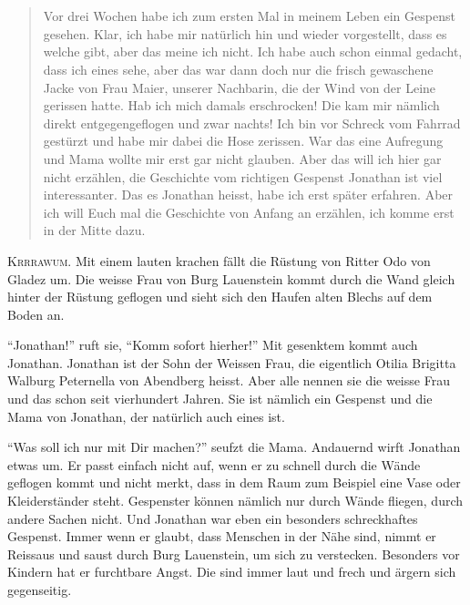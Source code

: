 \chapter*{}

\begin{quote}Vor drei Wochen habe ich zum ersten Mal in meinem Leben ein Gespenst gesehen. Klar, ich habe mir natürlich hin und wieder vorgestellt, dass es welche gibt, aber das meine ich nicht. Ich habe auch schon einmal gedacht, dass ich eines sehe, aber das war dann doch nur die frisch gewaschene Jacke von Frau Maier, unserer Nachbarin, die der Wind von der Leine gerissen hatte. Hab ich mich damals erschrocken! Die kam mir nämlich direkt entgegengeflogen und zwar nachts! Ich bin vor Schreck vom Fahrrad gestürzt und habe mir dabei die Hose zerissen. War das eine Aufregung und Mama wollte mir erst gar nicht glauben. Aber das will ich hier gar nicht erzählen, die Geschichte vom richtigen Gespenst Jonathan ist viel interessanter.  Das es Jonathan heisst, habe ich erst später erfahren. Aber ich will Euch mal die Geschichte von Anfang an erzählen, ich komme erst in der Mitte dazu.
\end{quote}

\lettrine[lines=2]{\color{red}K}{rrrawum.} Mit einem lauten krachen fällt die Rüstung von Ritter Odo von Gladez um. Die weisse Frau von Burg Lauenstein kommt durch die Wand gleich hinter der Rüstung geflogen und sieht sich den Haufen alten Blechs auf dem Boden an.

\enquote{Jonathan!} ruft sie, \enquote{Komm sofort hierher!} Mit gesenktem kommt auch Jonathan. Jonathan ist der Sohn der Weissen Frau, die eigentlich Otilia Brigitta Walburg Peternella von Abendberg heisst. Aber alle nennen sie die weisse Frau und das schon seit vierhundert Jahren. Sie ist nämlich ein Gespenst und die Mama von Jonathan, der natürlich auch eines ist. 

\enquote{Was soll ich nur mit Dir machen?} seufzt die Mama. Andauernd wirft Jonathan etwas um. Er passt einfach nicht auf, wenn er zu schnell durch die Wände geflogen kommt und nicht merkt, dass in dem Raum zum Beispiel eine Vase oder Kleiderständer steht. Gespenster können nämlich nur durch Wände fliegen, durch andere Sachen nicht. Und Jonathan war eben ein besonders schreckhaftes Gespenst. Immer wenn er glaubt, dass Menschen in der Nähe sind, nimmt er Reissaus und saust durch Burg Lauenstein, um sich zu verstecken. Besonders vor Kindern hat er furchtbare Angst. Die sind immer laut und frech und ärgern sich gegenseitig. 

